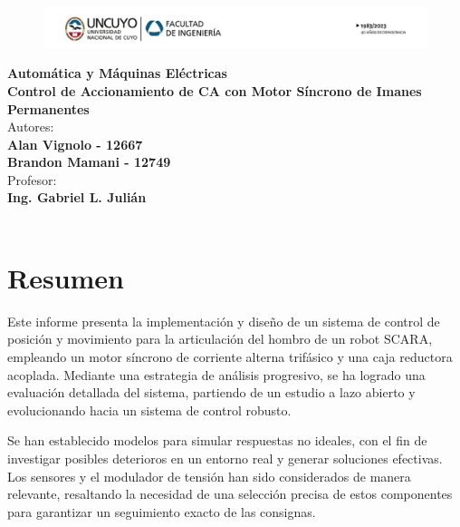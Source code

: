 \documentclass{article}
\begin{document}
\begin{titlepage}
    \centering
    \begin{figure}[h]
        \centering
        \includegraphics[width=1\textwidth]{encabezado.png}
    \end{figure}
    \vspace*{3cm}
    \huge{\textbf{Automática y Máquinas Eléctricas}}\\
    \vspace*{3cm}
    \Huge\textbf{Control de Accionamiento de CA con Motor Síncrono de Imanes Permanentes}\\
    \vspace*{6cm}
    \large{Autores:}\\
    \large{\textbf{Alan Vignolo - 12667\\Brandon Mamani - 12749}}\\
    \vspace*{1cm}
    \large{Profesor:}\\
    \large{\textbf{Ing. Gabriel L. Julián}}\\
    \vfill
    \the\year\\ %
\end{titlepage}


\tableofcontents
{}

\newpage

\part*{Resumen}

Este informe presenta la implementación y diseño de un sistema de control de posición y movimiento para 
la articulación del hombro de un robot SCARA, empleando un motor síncrono de corriente alterna trifásico 
y una caja reductora acoplada. Mediante una estrategia de análisis progresivo, se ha logrado una 
evaluación detallada del sistema, partiendo de un estudio a lazo abierto y evolucionando hacia un sistema 
de control robusto.

Se han establecido modelos para simular respuestas no ideales, con el fin de investigar posibles 
deterioros en un entorno real y generar soluciones efectivas. Los sensores y el modulador de tensión 
han sido considerados de manera relevante, resaltando la necesidad de una selección precisa de estos 
componentes para garantizar un seguimiento exacto de las consignas.
\end{document}
